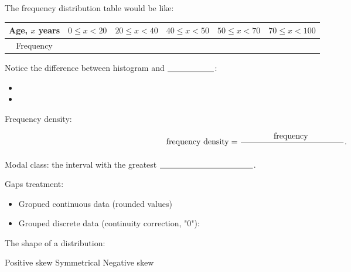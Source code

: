 The frequency distribution table would be like:
\vspace{0.5cm}

\renewcommand{\arraystretch}{1.2} %
\begin{tabular}{|c|c|c|c|c|c|}
	\hline
	Age, $x$ years & $0 \leqslant x < 20$  & $20 \leqslant x < 40$ & $40 \leqslant x < 50$ & $50 \leqslant x < 70$ & $70 \leqslant x < 100$ \\
	\hline
	Frequency &  &  &  &  &  \\
	\hline
\end{tabular}

\bigskip

Notice the difference between histogram and $\underline{\hspace{2 cm}}$:

\begin{itemize}
	\setlength\itemsep{4em}
	\item 
	\item 
\end{itemize}

\bigskip

Frequency density:

\[
\text{frequency density} = \frac{\text{\qquad \qquad frequency \qquad \qquad  }}{}.
\]

\vspace{1cm}

Modal class: the interval with the greatest $\underline{\hspace{4 cm}}$.

\vspace{0.5cm}

Gaps treatment:

\begin{itemize}
	\setlength\itemsep{4em}
	\item Gropued continuous data (rounded values)
	\item Grouped discrete data (continuity correction, "0"): 
\end{itemize}
\vspace{0.5cm}





\newpage

The shape of a distribution:

\medskip
\vspace{6cm}

Positive skew  \hspace{4.2cm} Symmetrical  \hspace{4.2cm} \hfill Negative skew



